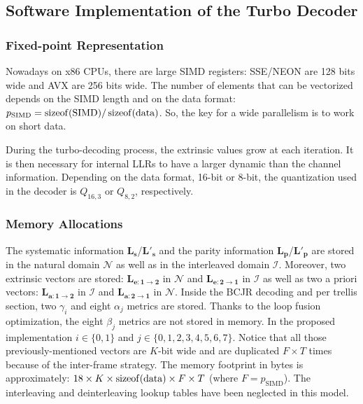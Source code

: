 \subsection{Software Implementation of the Turbo Decoder}
\label{sec:opt_turbo_implem}

\subsubsection{Fixed-point Representation}

Nowadays on x86 CPUs, there are large SIMD registers: SSE/NEON are 128 bits
wide and AVX are 256 bits wide. The number of elements that can be vectorized
depends on the SIMD length and on the data format:
$p_\text{SIMD} = \operatorname*{sizeof}(\text{SIMD}) / \operatorname*{sizeof}(\text{data})$. So, the key for a
wide parallelism is to work on short data.

During the turbo-decoding process, the extrinsic values grow at each iteration.
It is then necessary for internal LLRs to have a larger dynamic than the channel
information. Depending on the data format, 16-bit or 8-bit, the quantization
used in the decoder is $Q_{16,3}$ or $Q_{8,2}$, respectively.

\subsubsection{Memory Allocations}

The systematic information $\bm{L_s}$/$\bm{L'_s}$ and the parity information
$\bm{L_p}$/$\bm{L'_p}$ are stored in the natural domain $\mathcal{N}$ as well as
in the interleaved domain $\mathcal{I}$. Moreover, two extrinsic vectors are
stored: $\bm{L_{e:1 \rightarrow 2}}$ in $\mathcal{N}$ and
$\bm{L_{e:2 \rightarrow 1}}$ in $\mathcal{I}$ as well as two a priori vectors:
$\bm{L_{a:1 \rightarrow 2}}$ in $\mathcal{I}$ and
$\bm{L_{a:2 \rightarrow 1}}$ in $\mathcal{N}$. Inside the BCJR decoding and per
trellis section, two $\gamma_{i}$ and eight $\alpha_{j}$ metrics are stored.
Thanks to the loop fusion optimization, the eight $\beta_j$ metrics are not
stored in memory. In the proposed implementation $i \in \{0,1\}$ and $j \in
\{0,1,2,3,4,5,6,7\}$. Notice that all those previously-mentioned vectors are
$K$-bit wide and are duplicated $F\times T$ times because of the inter-frame
strategy. The memory footprint in bytes is approximately: $18 \times K \times
\operatorname*{sizeof}(\text{data}) \times F \times T$ (where $F = p_\text{SIMD}$). The
interleaving and deinterleaving lookup tables have been neglected in this model.

